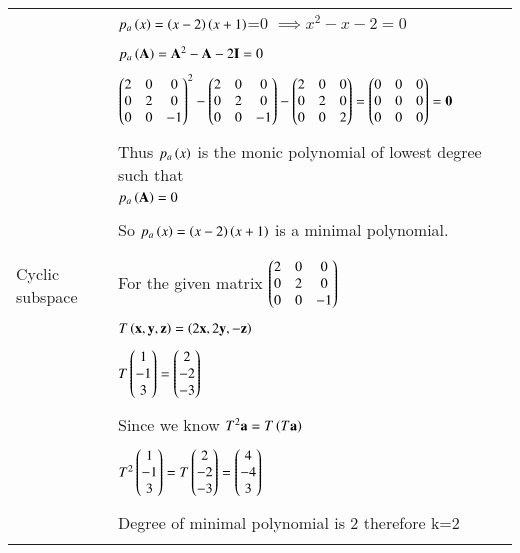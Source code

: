 \documentclass[journal,12pt]{IEEEtran}
\begin{document}
\begin{longtable}{|l|l|}
&$p_a\left(x\right)=\left(x-2\right)\left(x+1\right)$=0 $\implies x^2-x-2=0$\\
&\\
&$p_a\left(\mathbf{A}\right)=\mathbf{A}^2-\mathbf{A}-2\mathbf{I}=0$\\
&\\
&$\begin{pmatrix}2&0&0\\0&2&0\\0&0&-1\end{pmatrix}^2-\begin{pmatrix}2&0&0\\0&2&0\\0&0&-1\end{pmatrix}-\begin{pmatrix}2&0&0\\0&2&0\\0&0&2\end{pmatrix}=\begin{pmatrix}0&0&0\\0&0&0\\0&0&0\end{pmatrix}=\mathbf{0}$\\
&\\
&Thus $p_a\left(x\right)$ is the monic polynomial of lowest degree such that\\
&$p_a\left(\mathbf{A}\right)=0$\\
&\\
&So $p_a\left(x\right)=\left(x-2\right)\left(x+1\right)$ is a minimal polynomial.\\
&\\

\hline
\newpage
\hline

\multirow{3}{*}&\\ 


Cyclic subspace
&For the given matrix  $\begin{pmatrix}2&0&0\\0&2&0\\0&0&-1\end{pmatrix}$\\
&\\
&$T\left(\mathbf{x},\mathbf{y},\mathbf{z}\right)=\left(2\mathbf{x},2\mathbf{y},-\mathbf{z}\right)$\\

&\\
&$T\begin{pmatrix}1\\-1\\3\end{pmatrix}=\begin{pmatrix}2\\-2\\-3\end{pmatrix}$\\
&\\
&Since we know $T^2\mathbf{a}=T\left(T\mathbf{a}\right)$\\
&\\
&$T^2\begin{pmatrix}1\\-1\\3\end{pmatrix}=T\begin{pmatrix}2\\-2\\-3\end{pmatrix}=\begin{pmatrix}4\\-4\\3\end{pmatrix}$\\
&\\
&Degree of minimal polynomial is 2 therefore k=2\\
&\\


\end{longtable}
\end{document}

